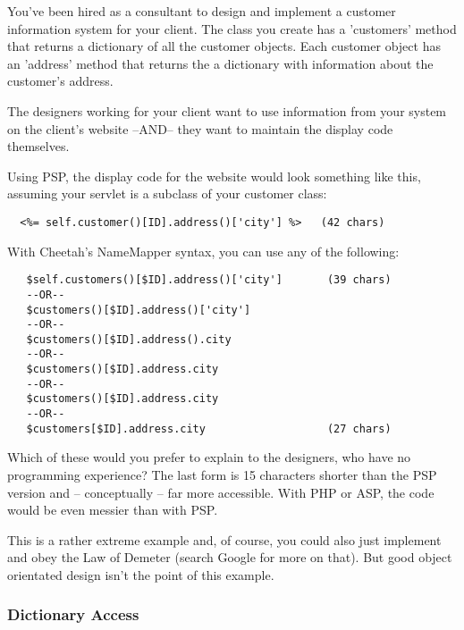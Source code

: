You've been hired as a consultant to design and implement a customer information
system for your client. The class you create has a 'customers' method that
returns a dictionary of all the customer objects.  Each customer object has an
'address' method that returns the a dictionary with information about the
customer's address.

The designers working for your client want to use information from your system
on the client's website --AND-- they want to maintain the display code
themselves.

Using PSP, the display code for the website would look something like this,
assuming your servlet is a subclass of your customer class:


\begin{verbatim}
  <%= self.customer()[ID].address()['city'] %>   (42 chars)
\end{verbatim}

With Cheetah's NameMapper syntax, you can use any of the following:

\begin{verbatim}
   $self.customers()[$ID].address()['city']       (39 chars)
   --OR--                                         
   $customers()[$ID].address()['city']           
   --OR--                                         
   $customers()[$ID].address().city              
   --OR--                                         
   $customers()[$ID].address.city                
   --OR--                                         
   $customers()[$ID].address.city
   --OR--
   $customers[$ID].address.city                   (27 chars)                     
\end{verbatim}   

Which of these would you prefer to explain to the designers, who have no
programming experience?  The last form is 15 characters shorter than the PSP
version and -- conceptually -- far more accessible. With PHP or ASP, the
code would be even messier than with PSP.

This is a rather extreme example and, of course, you could also just implement
 and obey the Law of Demeter (search Google for more
on that).  But good object orientated design isn't the point of this example.

\subsubsection{Dictionary Access}
\label{language.namemapper.dict}

